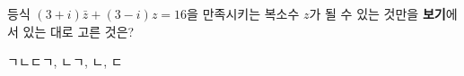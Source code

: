 등식 $(3+i)\bar{z}+(3-i)z=16$을 만족시키는 복소수 $z$가 될 수 있는 것만을 \textbf{보기}에서 있는 대로 고른 것은?  
\begin{choices32}{ㄱ}{ㄴ}{ㄷ}{ㄱ, ㄴ}{ㄱ, ㄴ, ㄷ}\end{choices32}
